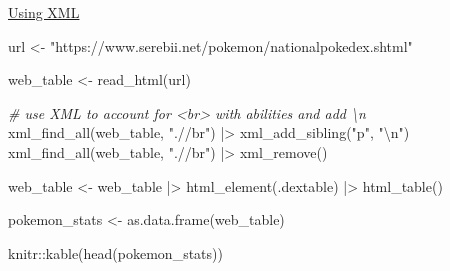 \documentclass[
]{article}
\newenvironment{Shaded}{\begin{snugshade}}{\end{snugshade}}
\newcommand{\CommentTok}[1]{\textcolor[rgb]{0.56,0.35,0.01}{\textit{#1}}}
\newcommand{\FunctionTok}[1]{\textcolor[rgb]{0.00,0.00,0.00}{#1}}
\newcommand{\NormalTok}[1]{#1}
\newcommand{\OtherTok}[1]{\textcolor[rgb]{0.56,0.35,0.01}{#1}}
\newcommand{\SpecialCharTok}[1]{\textcolor[rgb]{0.00,0.00,0.00}{#1}}
\newcommand{\StringTok}[1]{\textcolor[rgb]{0.31,0.60,0.02}{#1}}
\begin{document}
\href{https://stackoverflow.com/questions/30921626/can-rvest-keep-inline-html-tags-such-as-br-using-html-table}{Using
XML}

\begin{Shaded}
\begin{Highlighting}[]
\NormalTok{url }\OtherTok{\textless{}{-}} \StringTok{"https://www.serebii.net/pokemon/nationalpokedex.shtml"}

\NormalTok{web\_table }\OtherTok{\textless{}{-}} \FunctionTok{read\_html}\NormalTok{(url) }

\CommentTok{\# use XML to account for \textless{}br\textgreater{} with abilities and add \textquotesingle{}\textbackslash{}n\textquotesingle{}}
\FunctionTok{xml\_find\_all}\NormalTok{(web\_table, }\StringTok{".//br"}\NormalTok{) }\SpecialCharTok{|\textgreater{}} 
  \FunctionTok{xml\_add\_sibling}\NormalTok{(}\StringTok{"p"}\NormalTok{, }\StringTok{"}\SpecialCharTok{\textbackslash{}n}\StringTok{"}\NormalTok{)}
\FunctionTok{xml\_find\_all}\NormalTok{(web\_table, }\StringTok{".//br"}\NormalTok{) }\SpecialCharTok{|\textgreater{}} 
  \FunctionTok{xml\_remove}\NormalTok{() }

\NormalTok{web\_table }\OtherTok{\textless{}{-}} 
\NormalTok{  web\_table }\SpecialCharTok{|\textgreater{}} 
  \FunctionTok{html\_element}\NormalTok{(}\StringTok{\textquotesingle{}.dextable\textquotesingle{}}\NormalTok{) }\SpecialCharTok{|\textgreater{}} 
  \FunctionTok{html\_table}\NormalTok{()}

\NormalTok{pokemon\_stats }\OtherTok{\textless{}{-}} \FunctionTok{as.data.frame}\NormalTok{(web\_table)}

\NormalTok{knitr}\SpecialCharTok{::}\FunctionTok{kable}\NormalTok{(}\FunctionTok{head}\NormalTok{(pokemon\_stats))}
\end{Highlighting}
\end{Shaded}
\end{document}
